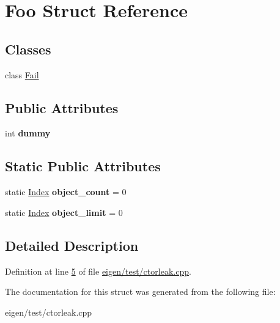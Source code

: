 \hypertarget{struct_foo}{}\section{Foo Struct Reference}
\label{struct_foo}
\subsection*{Classes}
\begin{DoxyCompactItemize}
\item 
class \hyperlink{class_foo_1_1_fail}{Fail}
\end{DoxyCompactItemize}
\subsection*{Public Attributes}
\begin{DoxyCompactItemize}
\item 
\mbox{\label{struct_foo_a54479cc8eb0834f22e3c45bf81a22bd7}} 
int {\bfseries dummy}
\end{DoxyCompactItemize}
\subsection*{Static Public Attributes}
\begin{DoxyCompactItemize}
\item 
\mbox{\label{struct_foo_a8bcd37d1efaf0fb4040cc05c51672dc8}} 
static \hyperlink{namespace_eigen_a62e77e0933482dafde8fe197d9a2cfde}{Index} {\bfseries object\+\_\+count} = 0
\item 
\mbox{\label{struct_foo_a6eba03413a35a11809123752552c885f}} 
static \hyperlink{namespace_eigen_a62e77e0933482dafde8fe197d9a2cfde}{Index} {\bfseries object\+\_\+limit} = 0
\end{DoxyCompactItemize}


\subsection{Detailed Description}


Definition at line \hyperlink{eigen_2test_2ctorleak_8cpp_source_l00005}{5} of file \hyperlink{eigen_2test_2ctorleak_8cpp_source}{eigen/test/ctorleak.\+cpp}.



The documentation for this struct was generated from the following file\+:\begin{DoxyCompactItemize}
\item 
eigen/test/ctorleak.\+cpp\end{DoxyCompactItemize}
